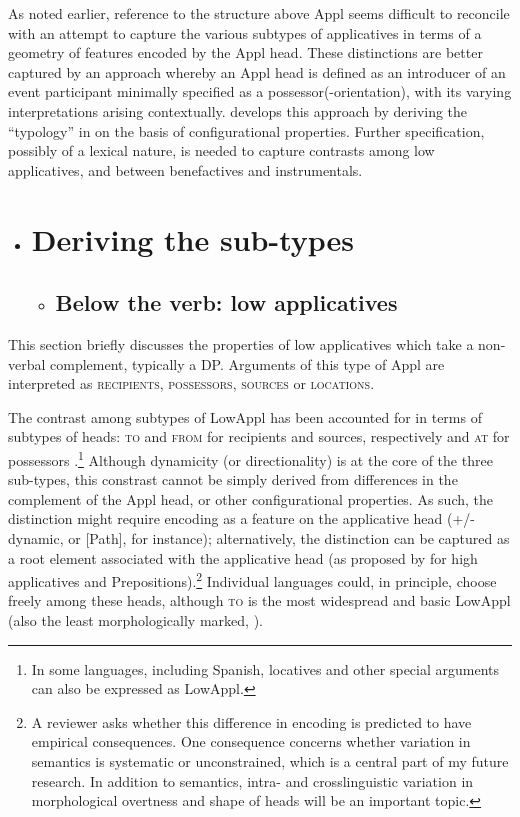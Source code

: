 \documentclass[output=paper,modfonts,nonflat]{langsci/langscibook}
\begin{document}
As noted earlier, reference to the structure above Appl seems difficult to reconcile with an attempt to capture the various subtypes of applicatives in terms of a geometry of features encoded by the Appl head. These distinctions are better captured by an approach whereby an Appl head is defined as an introducer of an event participant minimally specified as a possessor(-orientation), with its varying interpretations arising contextually.  develops this approach by deriving the “typology” in  on the basis of configurational properties. Further specification, possibly of a lexical nature, is needed to capture contrasts among low applicatives, and between benefactives and instrumentals.  

\begin{itemize}
\item \section{Deriving the sub-types}

\begin{itemize}
\item \subsection{Below the verb: low applicatives}
\end{itemize}
\end{itemize}

This section briefly discusses the properties of low applicatives which take a non-verbal complement, typically a DP. Arguments of this type of Appl are interpreted as \textsc{recipients}, \textsc{possessors}, \textsc{sources} or \textsc{locations}. 

The contrast among subtypes of LowAppl has been accounted for in terms of subtypes of heads: \textsc{to} and \textsc{from} for recipients and sources, respectively \citep{Pylkkänen2008} and \textsc{at} for possessors \citep{Cuervo2003}.\footnote{In some languages, including Spanish, locatives and other special arguments can also be expressed as LowAppl.} Although dynamicity (or directionality) is at the core of the three sub-types, this constrast cannot be simply derived from differences in the complement of the Appl head, or other configurational properties.  As such, the distinction might require encoding as a feature on the applicative head (+/- dynamic, or [Path], for instance); alternatively, the distinction can be captured as a root element associated with the applicative head (as proposed by \citealt{WoodMarantz2017} for high applicatives and Prepositions).\footnote{A reviewer asks whether this difference in encoding is predicted to have empirical consequences. One consequence concerns whether variation in semantics is systematic or unconstrained, which is a central part of my future research. In addition to semantics, intra- and crosslinguistic variation in morphological overtness and shape of heads will be an important topic.} Individual languages could, in principle, choose freely among these heads, although \textsc{to} is the most widespread and basic LowAppl (also the least morphologically marked, \citealt{Cuervo2015a}).
\end{document}
